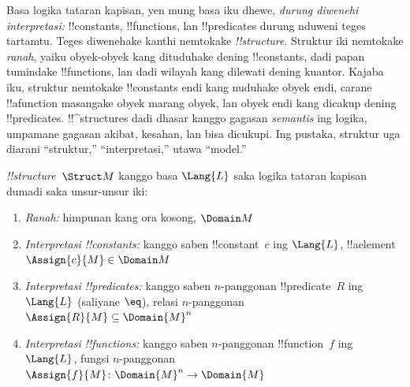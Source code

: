 \documentclass[../../../include/open-logic-section]{subfiles}
\begin{document}


\begin{explain}
Basa logika tataran kapisan, yen mung basa iku dhewe, \emph{durung diwenehi
interpretasi:} !!{constant}s, !!{function}s, lan !!{predicate}s durung
nduweni teges tartamtu. Teges diwenehake kanthi nemtokake
 \emph{!!{structure}}. Struktur iki nemtokake
\emph{ranah}, yaiku obyek-obyek kang dituduhake dening !!{constant}s,
dadi papan tumindake !!{function}s, lan dadi wilayah kang dilewati
dening kuantor. Kajaba iku, struktur nemtokake !!{constant}s endi
kang nuduhake obyek endi, carane !!a{function} masangake obyek
marang obyek, lan obyek endi kang dicakup dening !!{predicate}s.
!!^{structure}s dadi dhasar kanggo gagasan \emph{semantis} ing logika,
umpamane gagasan akibat, kesahan, lan bisa dicukupi. Ing pustaka,
struktur uga diarani ``struktur,'' ``interpretasi,'' utawa ``model.''
\end{explain}

\begin{defn}[!!^{structure}s]
 \emph{!!{structure}}~$\Struct M$ kanggo basa
$\Lang{L}$ saka logika tataran kapisan dumadi saka unsur-unsur iki:
\begin{enumerate}
\item \emph{Ranah:} himpunan kang ora kosong, $\Domain M$
\item \emph{Interpretasi !!{constant}s:} kanggo saben !!{constant}~$c$
  ing $\Lang{L}$, !!a{element} $\Assign{c}{M} \in \Domain M$
\item \emph{Interpretasi !!{predicate}s:} kanggo saben $n$-panggonan
  !!{predicate}~$R$ ing $\Lang{L}$ (saliyane $\eq$), relasi
  $n$-panggonan $\Assign{R}{M} \subseteq \Domain{M}^n$
\item \emph{Interpretasi !!{function}s:} kanggo saben $n$-panggonan
  !!{function}~$f$ ing $\Lang{L}$, fungsi $n$-panggonan
  $\Assign{f}{M} \colon \Domain{M}^n \to \Domain{M}$
\end{enumerate}
\end{defn}
\end{document}
